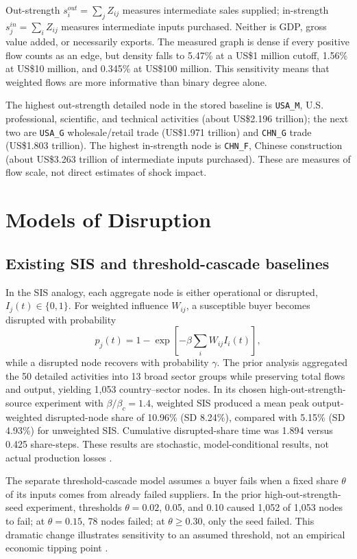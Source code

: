 \documentclass[conference,a4paper,twoside]{IEEEtran}
\begin{document}
Out-strength $s_i^{out}=\sum_j Z_{ij}$ measures intermediate sales supplied; in-strength $s_j^{in}=\sum_i Z_{ij}$ measures intermediate inputs purchased. Neither is GDP, gross value added, or necessarily exports. The measured graph is dense if every positive flow counts as an edge, but density falls to 5.47\% at a US\$1 million cutoff, 1.56\% at US\$10 million, and 0.345\% at US\$100 million. This sensitivity means that weighted flows are more informative than binary degree alone.

The highest out-strength detailed node in the stored baseline is \texttt{USA\_M}, U.S. professional, scientific, and technical activities (about US\$2.196 trillion); the next two are \texttt{USA\_G} wholesale/retail trade (US\$1.971 trillion) and \texttt{CHN\_G} trade (US\$1.803 trillion). The highest in-strength node is \texttt{CHN\_F}, Chinese construction (about US\$3.263 trillion of intermediate inputs purchased). These are measures of flow scale, not direct estimates of shock impact.

\section{Models of Disruption}
\subsection{Existing SIS and threshold-cascade baselines}
In the SIS analogy, each aggregate node is either operational or disrupted, $I_j(t)\in\{0,1\}$. For weighted influence $W_{ij}$, a susceptible buyer becomes disrupted with probability
\begin{equation}
p_j(t)=1-\exp\!\left[-\beta\sum_i W_{ij}I_i(t)\right],
\label{eq:sis}
\end{equation}
while a disrupted node recovers with probability $\gamma$. The prior analysis aggregated the 50 detailed activities into 13 broad sector groups while preserving total flows and output, yielding 1,053 country--sector nodes. In its chosen high-out-strength-source experiment with $\beta/\beta_c=1.4$, weighted SIS produced a mean peak output-weighted disrupted-node share of 10.96\% (SD 8.24\%), compared with 5.15\% (SD 4.93\%) for unweighted SIS. Cumulative disrupted-share time was 1.894 versus 0.425 share-steps. These results are stochastic, model-conditional results, not actual production losses \cite{pastor,berger}.

The separate threshold-cascade model assumes a buyer fails when a fixed share $\theta$ of its inputs comes from already failed suppliers. In the prior high-out-strength-seed experiment, thresholds $\theta=0.02$, 0.05, and 0.10 caused 1,052 of 1,053 nodes to fail; at $\theta=0.15$, 78 nodes failed; at $\theta\geq0.30$, only the seed failed. This dramatic change illustrates sensitivity to an assumed threshold, not an empirical economic tipping point \cite{watts}.
\end{document}
